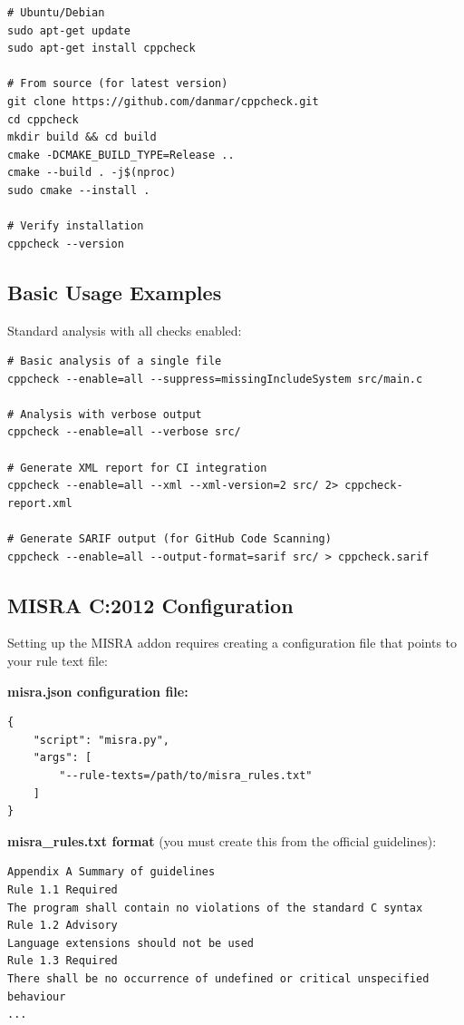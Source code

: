 \documentclass[11pt,letterpaper]{report}
\begin{document}
\begin{lstlisting}[style=bashstyle]
# Ubuntu/Debian
sudo apt-get update
sudo apt-get install cppcheck

# From source (for latest version)
git clone https://github.com/danmar/cppcheck.git
cd cppcheck
mkdir build && cd build
cmake -DCMAKE_BUILD_TYPE=Release ..
cmake --build . -j$(nproc)
sudo cmake --install .

# Verify installation
cppcheck --version
\end{lstlisting}

\subsection{Basic Usage Examples}

Standard analysis with all checks enabled:

\begin{lstlisting}[style=bashstyle]
# Basic analysis of a single file
cppcheck --enable=all --suppress=missingIncludeSystem src/main.c

# Analysis with verbose output
cppcheck --enable=all --verbose src/

# Generate XML report for CI integration
cppcheck --enable=all --xml --xml-version=2 src/ 2> cppcheck-report.xml

# Generate SARIF output (for GitHub Code Scanning)
cppcheck --enable=all --output-format=sarif src/ > cppcheck.sarif
\end{lstlisting}

\subsection{MISRA C:2012 Configuration}

Setting up the MISRA addon requires creating a configuration file that points to your rule text file:

\textbf{misra.json configuration file:}

\begin{lstlisting}[style=codestyle]
{
    "script": "misra.py",
    "args": [
        "--rule-texts=/path/to/misra_rules.txt"
    ]
}
\end{lstlisting}

\textbf{misra\_rules.txt format} (you must create this from the official guidelines):

\begin{lstlisting}[style=codestyle]
Appendix A Summary of guidelines
Rule 1.1 Required
The program shall contain no violations of the standard C syntax
Rule 1.2 Advisory
Language extensions should not be used
Rule 1.3 Required
There shall be no occurrence of undefined or critical unspecified behaviour
...
\end{lstlisting}
\end{document}

